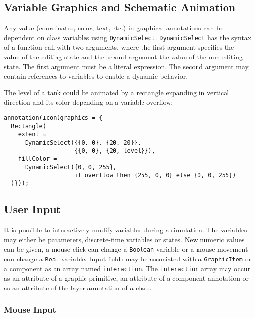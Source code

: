 \subsection{Variable Graphics and Schematic Animation}\label{variable-graphics-and-schematic-animation}

Any value (coordinates, color, text, etc.) in graphical annotations can be dependent on class variables using \lstinline!DynamicSelect!.
\lstinline!DynamicSelect! has the syntax of a function call with two arguments, where the first argument specifies the value of the editing state and the second argument the value of the non-editing state.
The first argument must be a literal expression.
The second argument may contain references to variables to enable a dynamic behavior.

\begin{example}
The level of a tank could be animated by a rectangle expanding in vertical direction and its color depending on a variable overflow:
\begin{lstlisting}[language=modelica]
annotation(Icon(graphics = {
  Rectangle(
    extent =
      DynamicSelect({{0, 0}, {20, 20}},
                    {{0, 0}, {20, level}}),
    fillColor =
      DynamicSelect({0, 0, 255},
                    if overflow then {255, 0, 0} else {0, 0, 255})
  )}));
\end{lstlisting}
\end{example}

\subsection{User Input}\label{user-input}

It is possible to interactively modify variables during a simulation.  The variables may either be parameters, discrete-time variables or states.  New numeric values can be given, a mouse click can change a \lstinline!Boolean! variable or a mouse movement can change a \lstinline!Real! variable.  Input fields may be associated with a \lstinline!GraphicItem! or a component as an array named \lstinline!interaction!.  The \lstinline!interaction! array may occur as an attribute of a graphic primitive, an attribute of a component annotation or as an attribute of the layer annotation of a class.

\subsubsection{Mouse Input}\label{mouse-input}

